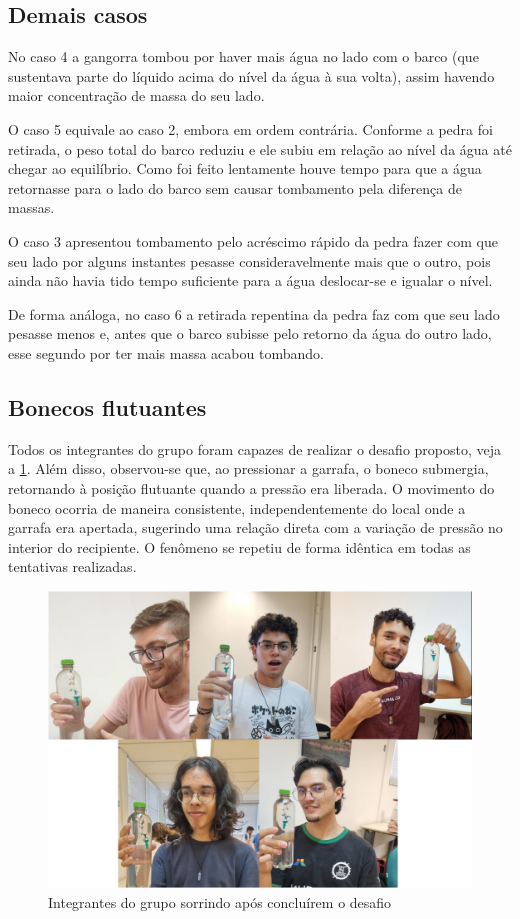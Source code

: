 \subsection{Demais casos}
No caso 4 a gangorra tombou por haver mais água no lado com o barco (que sustentava parte do líquido acima do nível da água à sua volta), assim havendo maior concentração de massa do seu lado.

O caso 5 equivale ao caso 2, embora em ordem contrária. Conforme a pedra foi retirada, o peso total do barco reduziu e ele subiu em relação ao nível da água até chegar ao equilíbrio. Como foi feito lentamente houve tempo para que a água retornasse para o lado do barco sem causar tombamento pela diferença de massas.

O caso 3 apresentou tombamento pelo acréscimo rápido da pedra fazer com que seu lado por alguns instantes pesasse consideravelmente mais que o outro, pois ainda não havia tido tempo suficiente para a água deslocar-se e igualar o nível.

De forma análoga, no caso 6 a retirada repentina da pedra faz com que seu lado pesasse menos e, antes que o barco subisse pelo retorno da água do outro lado, esse segundo por ter mais massa acabou tombando.

\subsection{Bonecos flutuantes}

Todos os integrantes do grupo foram capazes de realizar o desafio proposto, veja
a \cref{figdesafio}. Além disso, observou-se que, ao pressionar a garrafa, o
boneco submergia, retornando à posição flutuante quando a pressão era liberada.
O movimento do boneco ocorria de maneira consistente, independentemente do local
onde a garrafa era apertada, sugerindo uma relação direta com a variação de
pressão no interior do recipiente. O fenômeno se repetiu de forma idêntica em
todas as tentativas realizadas.

\begin{figure}[H]
    \centering
    \includegraphics[width=.5\linewidth]{fig/desafio.png}
    \caption{Integrantes do grupo sorrindo após concluírem o desafio}
    \label{figdesafio}
\end{figure}

